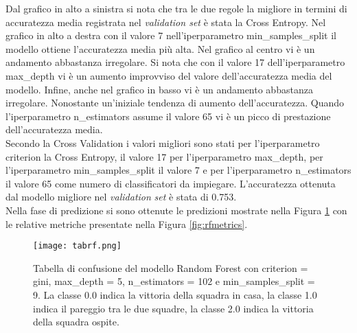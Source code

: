 Dal grafico in alto a sinistra si nota che tra le due regole la migliore in termini di accuratezza media registrata nel \emph{validation set} è stata la Cross Entropy. Nel grafico in alto a destra con il valore 7 nell'iperparametro \textsf{min\_samples\_split} il modello ottiene l'accuratezza media più alta. Nel grafico al centro vi è un andamento abbastanza irregolare. Si nota che con il valore 17 dell'iperparametro \textsf{max\_depth} vi è un aumento improvviso del valore dell'accuratezza media del modello. Infine, anche nel grafico in basso vi è un andamento abbastanza irregolare. Nonostante un'iniziale tendenza di aumento dell'accuratezza. Quando l'iperparametro \textsf{n\_estimators} assume il valore 65 vi è un picco di prestazione dell'accuratezza media.\\
Secondo la Cross Validation i valori migliori sono stati per l'iperparametro \textsf{criterion} la Cross Entropy, il valore 17 per l'iperparametro \textsf{max\_depth}, per l'iperparametro \textsf{min\_samples\_split} il valore 7 e per l'iperparametro \textsf{n\_estimators} il valore 65 come numero di classificatori da impiegare.
L'accuratezza ottenuta dal modello migliore nel \emph{validation} \emph{set} è stata di 0.753.\\
Nella fase di predizione si sono ottenute le predizioni mostrate nella Figura \ref{fig:tabrf} con le relative metriche presentate nella Figura \ref{fig:rfmetrics}.
\begin{figure}[h]
	\begin{center}
		\texttt{[image: tabrf.png]}
		\caption{Tabella di confusione del modello Random Forest con \textsf{criterion} = gini, \textsf{max\_depth} = 5, \textsf{n\_estimators} = 102 e \textsf{min\_samples\_split} = 9. La classe 0.0 indica la vittoria della squadra in casa, la classe 1.0 indica il pareggio tra le due squadre, la classe 2.0 indica la vittoria della squadra ospite.
		} 
		\label{fig:tabrf}
	\end{center}
\end{figure}

